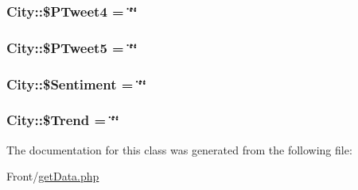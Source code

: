 \subsubsection[{\texorpdfstring{\$\+P\+Tweet4}{$PTweet4}}]{\setlength{\rightskip}{0pt plus 5cm}City\+::\$\+P\+Tweet4 = \char`\"{}\char`\"{}}\hypertarget{classCity_a1c1e5c48b136d0c5bdc2a28401162bb5}{}\label{classCity_a1c1e5c48b136d0c5bdc2a28401162bb5}
\subsubsection[{\texorpdfstring{\$\+P\+Tweet5}{$PTweet5}}]{\setlength{\rightskip}{0pt plus 5cm}City\+::\$\+P\+Tweet5 = \char`\"{}\char`\"{}}\hypertarget{classCity_a015736b4b7e53f4a8fb4b8913879eda5}{}\label{classCity_a015736b4b7e53f4a8fb4b8913879eda5}
\subsubsection[{\texorpdfstring{\$\+Sentiment}{$Sentiment}}]{\setlength{\rightskip}{0pt plus 5cm}City\+::\$\+Sentiment = \char`\"{}\char`\"{}}\hypertarget{classCity_af303329814ddeefe78effa154adde16d}{}\label{classCity_af303329814ddeefe78effa154adde16d}
\subsubsection[{\texorpdfstring{\$\+Trend}{$Trend}}]{\setlength{\rightskip}{0pt plus 5cm}City\+::\$\+Trend = \char`\"{}\char`\"{}}\hypertarget{classCity_a32e0805ba9ae11b3aa658d60029df1fc}{}\label{classCity_a32e0805ba9ae11b3aa658d60029df1fc}


The documentation for this class was generated from the following file\+:\begin{DoxyCompactItemize}
\item 
Front/\hyperlink{getData_8php}{get\+Data.\+php}\end{DoxyCompactItemize}
